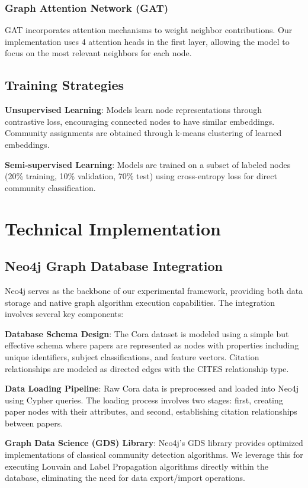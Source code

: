 \documentclass[conference]{IEEEtran}
\begin{document}
\subsubsection{Graph Attention Network (GAT)}
GAT incorporates attention mechanisms to weight neighbor contributions. Our implementation uses 4 attention heads in the first layer, allowing the model to focus on the most relevant neighbors for each node.

\subsection{Training Strategies}

\textbf{Unsupervised Learning}: Models learn node representations through contrastive loss, encouraging connected nodes to have similar embeddings. Community assignments are obtained through k-means clustering of learned embeddings.

\textbf{Semi-supervised Learning}: Models are trained on a subset of labeled nodes (20\% training, 10\% validation, 70\% test) using cross-entropy loss for direct community classification.

\section{Technical Implementation}

\subsection{Neo4j Graph Database Integration}

Neo4j serves as the backbone of our experimental framework, providing both data storage and native graph algorithm execution capabilities. The integration involves several key components:

\textbf{Database Schema Design}: The Cora dataset is modeled using a simple but effective schema where papers are represented as nodes with properties including unique identifiers, subject classifications, and feature vectors. Citation relationships are modeled as directed edges with the CITES relationship type.

\textbf{Data Loading Pipeline}: Raw Cora data is preprocessed and loaded into Neo4j using Cypher queries. The loading process involves two stages: first, creating paper nodes with their attributes, and second, establishing citation relationships between papers.

\textbf{Graph Data Science (GDS) Library}: Neo4j's GDS library provides optimized implementations of classical community detection algorithms. We leverage this for executing Louvain and Label Propagation algorithms directly within the database, eliminating the need for data export/import operations.
\end{document}
